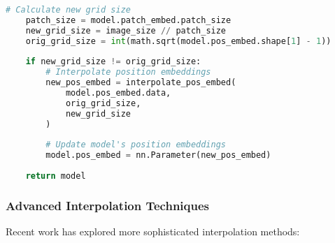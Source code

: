 \begin{lstlisting}[language=Python, caption=Position embedding interpolation for different resolutions]
    # Calculate new grid size
    patch_size = model.patch_embed.patch_size
    new_grid_size = image_size // patch_size
    orig_grid_size = int(math.sqrt(model.pos_embed.shape[1] - 1))
    
    if new_grid_size != orig_grid_size:
        # Interpolate position embeddings
        new_pos_embed = interpolate_pos_embed(
            model.pos_embed.data,
            orig_grid_size,
            new_grid_size
        )
        
        # Update model's position embeddings
        model.pos_embed = nn.Parameter(new_pos_embed)
    
    return model
\end{lstlisting}

\subsubsection{Advanced Interpolation Techniques}

Recent work has explored more sophisticated interpolation methods:

